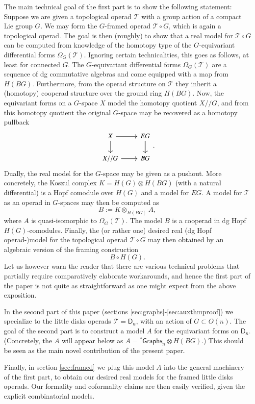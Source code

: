 \documentclass[a4paper]{amsart}
\theoremstyle{plain}
\theoremstyle{definition}
\newcommand{\Graphs}{{\mathsf{Graphs}}}
\newcommand{\op}{\mathcal}
\newcommand{\stG}{{}^*\Graphs}
\newcommand{\lD}{\mathsf{D}}
\begin{document}
The main technical goal of the first part is to show the following statement: Suppose we are given a topological operad $\op T$ with a group action of a compact Lie group $G$.
We may form the $G$-framed operad $\op T\circ G$, which is again a topological operad.
The goal is then (roughly) to show that a real model for $\op T\circ G$ can be computed from knowledge of the homotopy type of the $G$-equivariant differential forms $\Omega_G(\op T)$.
Ignoring certain technicalities, this goes as follows, at least for connected $G$. The $G$-equivariant differential forms $\Omega_G(\op T)$ are a sequence of dg commutative algebras and come equipped with a map from $H(BG)$. Furthermore, from the operad structure on $\op T$ they inherit a (homotopy) cooperad structure over the ground ring $H(BG)$.
Now, the equivariant forms on a $G$-space $X$ model the homotopy quotient $X//G$, and from this homotopy quotient the original $G$-space may be recovered as a homotopy pullback
\[
\begin{tikzcd}
X \ar{r}\ar{d} & EG \ar{d} \\
X//G \ar {r} & BG 
\end{tikzcd}.
\]
Dually, the real model for the $G$-space may be given as a pushout. More concretely, the Koszul complex $K=H(G)\otimes H(BG)$ (with a natural differential) is a Hopf comodule over $H(G)$ and a model for $EG$. A model for $\op T$ as an operad in $G$-spaces may then be computed as 
\[
B := K\otimes_{H(BG)} A,
\]
where $A$ is quasi-isomorphic to $\Omega_G(\op T)$. 
The model $B$ is a cooperad in dg Hopf $H(G)$-comodules.
Finally, the (or rather one) desired real (dg Hopf operad-)model for the topological operad $\op T\circ G$ may then obtained by an algebraic version of the framing construction 
\[
 B\circ H(G).
\]
Let us however warn the reader that there are various technical problems that partially require comparatively elaborate workarounds, and hence the first part of the paper is not quite as straightforward as one might expect from the above exposition.


In the second part of this paper (sections \ref{sec:graphs}-\ref{sec:auxthmproof}) we specialize to the little disks operads $\op T=\lD_n$, with an action of $G\subset O(n)$. 
The goal of the second part is to construct a model $A$ for the equivariant forms on $\lD_n$.
(Concretely, the $A$ will appear below as $A=\stG_n\otimes H(BG)$.)
This should be seen as the main novel contribution of the present paper.

Finally, in section \ref{sec:framed} we plug this model $A$ into the general machinery of the first part, to obtain our desired real models for the framed little disks operads.
Our formality and coformality claims are then easily verified, given the explicit combinatorial models.
\end{document}
